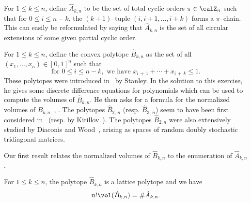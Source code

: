For $1\leq k \leq n$, define $\hat{A}_{k,n}$ to be the set of total cyclic orders $\pi\in\calZ_n$ such that for $0\leq i \leq n-k$, the $(k+1)$--tuple $(i,i+1,\ldots,i+k)$ forms a $\pi$--chain. This can easily be reformulated by saying that $\hat{A}_{k,n}$ is the set of all circular extensions of some given partial cyclic order.

For $1\leq k\leq n$, define the convex polytope $\hat{B}_{k,n}$ as the set of all $(x_1,\ldots,x_n)\in[0,1]^n$ such that
\[
\text{for } 0 \leq i \leq n-k, \text{ we have } x_{i\,+\,1} + \cdots + x_{i\,+\,k}\leq 1.
\]
These polytopes were introduced in~\cite[Exercise~4.56$\MK$(c)]{S12} by Stanley. In the solution to this exercise, he gives some discrete difference equations for polynomials which can be used to compute the volumes of $\hat{B}_{k,n}$. He then asks for a formula for the normalized volumes of $\hat{B}_{k,n}$~\cite{stanley-2012}, \cite[Exercise~4.56$\MK$(d)]{S12}. The polytopes $\hat{B}_{2,\,n}$ (resp. $\hat{B}_{3,\,n}$) seem to have been first considered in~\cite{SMN79} (resp. by Kirillov~\cite[Sequence A096402]{OEIS}). The polytopes $\hat{B}_{2,n}$ were also extensively studied by Diaconis and Wood~\cite{DW13}, arising as spaces of random doubly stochastic tridiagonal matrices.

Our first result relates the normalized volumes of $\hat{B}_{k,n}$ to the enumeration of $\hat{A}_{k,n}$.

\begin{theo}\label{thm:Stanleyvolumes}
For $1\leq k\leq n$, the polytope $\hat{B}_{k,n}$ is a lattice polytope and we have
\begin{equation}
n! \vol(\hat{B}_{k,n}) = \# \hat{A}_{k,n}.
\end{equation}
\end{theo}

